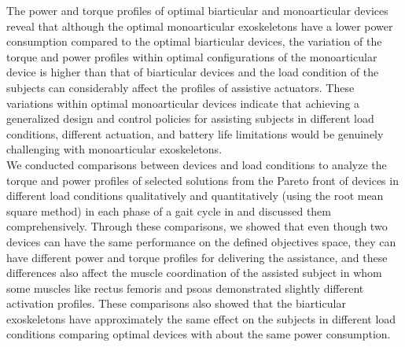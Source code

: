\documentclass[10pt,letterpaper]{article}
\begin{document}
The power and torque profiles of optimal biarticular and monoarticular devices reveal that although the optimal monoarticular exoskeletons have a lower power consumption compared to the optimal biarticular devices, the variation of the torque and power profiles within optimal configurations of the monoarticular device is higher than that of biarticular devices and the load condition of the subjects can considerably affect the profiles of assistive actuators. These variations within optimal monoarticular devices indicate that achieving a generalized design and control policies for assisting subjects in different load conditions, different actuation, and battery life limitations would be genuinely challenging with monoarticular exoskeletons.\\
We conducted comparisons between devices and load conditions to analyze the torque and power profiles of selected solutions from the Pareto front of devices in different load conditions qualitatively and quantitatively (using the root mean square method) in each phase of a gait cycle in  and discussed them comprehensively. Through these comparisons, we showed that even though two devices can have the same performance on the defined objectives space, they can have different power and torque profiles for delivering the assistance, and these differences also affect the muscle coordination of the assisted subject in whom some muscles like rectus femoris and psoas demonstrated slightly different activation profiles. These comparisons also showed that the biarticular exoskeletons have approximately the same effect on the subjects in different load conditions comparing optimal devices with about the same power consumption.\\
\end{document}
